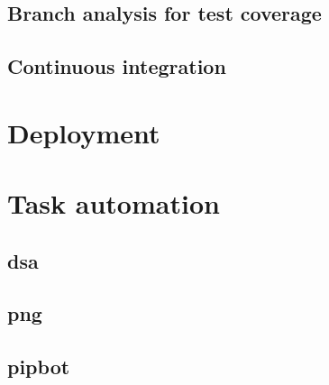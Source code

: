 \lipsum[13-14]

\subsection{Branch analysis for test coverage}

\lipsum[12-16]


\subsection{Continuous integration}

\lipsum[18-26]


\section{Deployment}

\lipsum[12-24]


\section{Task automation}

\lipsum[50]

\subsection{dsa}

\lipsum[35-42]

\subsection{png}

\lipsum[40-48]

\newpage
\subsection{pipbot}\label{sec:pipbot}

\lipsum[30]

